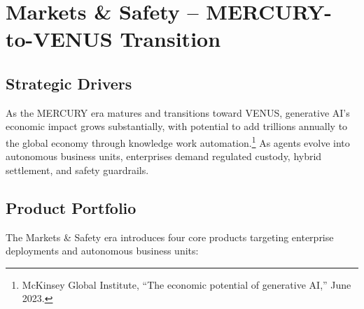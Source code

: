 \documentclass[11pt]{article}
\begin{document}
\section{Markets \& Safety -- MERCURY-to-VENUS Transition}
\subsection{Strategic Drivers}
As the MERCURY era matures and transitions toward VENUS, generative AI's economic impact grows substantially, with potential to add trillions annually to the global economy through knowledge work automation.\footnote{McKinsey Global Institute, ``The economic potential of generative AI,'' June 2023.} As agents evolve into autonomous business units, enterprises demand regulated custody, hybrid settlement, and safety guardrails.

\subsection{Product Portfolio}
The Markets \& Safety era introduces four core products targeting enterprise deployments and autonomous business units:
\end{document}
